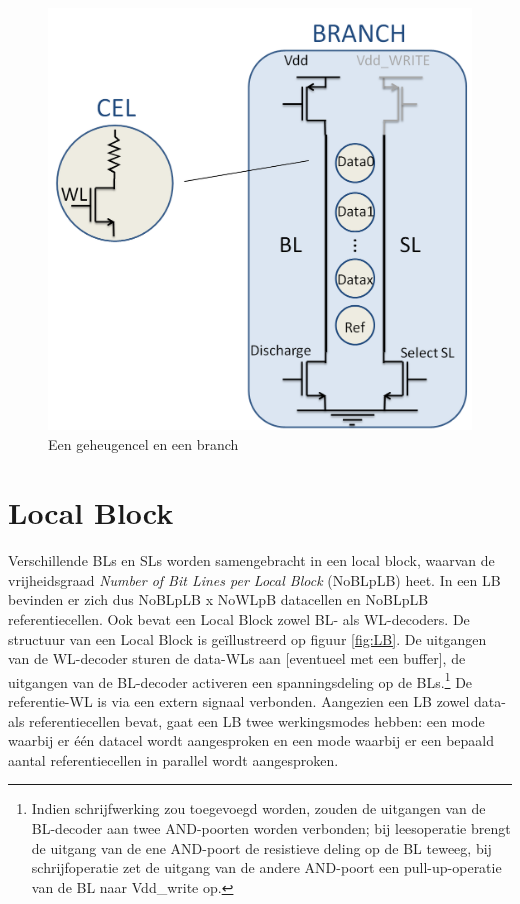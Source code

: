 \begin{figure}
  \centering
  \includegraphics[scale=0.3]{../fig/hfdstk-architecture-cell-branch.png}
  \caption{Een geheugencel en een branch}
  \label{fig:cellbranch}
\end{figure}

\section{Local Block}
Verschillende BLs en SLs worden samengebracht in een local block, waarvan de vrijheidsgraad \emph{Number of Bit Lines per Local Block} (NoBLpLB) heet. In een LB bevinden er zich dus NoBLpLB x NoWLpB datacellen en NoBLpLB referentiecellen. Ook bevat een Local Block zowel BL- als WL-decoders.
De structuur van een Local Block is geïllustreerd op figuur \ref{fig:LB}.
De uitgangen van de WL-decoder sturen de data-WLs aan [eventueel met een buffer], de uitgangen van de BL-decoder activeren een spanningsdeling op de BLs.\footnote{Indien schrijfwerking zou toegevoegd worden, zouden de uitgangen van de BL-decoder aan twee AND-poorten worden verbonden; bij leesoperatie brengt de uitgang van de ene AND-poort de resistieve deling op de BL teweeg, bij schrijfoperatie zet de uitgang van de andere AND-poort een pull-up-operatie van de BL naar Vdd\_write op.} De referentie-WL is via een extern signaal verbonden.
Aangezien een LB zowel data- als referentiecellen bevat, gaat een LB twee werkingsmodes hebben: een mode waarbij er één datacel wordt aangesproken en een mode waarbij er een bepaald aantal referentiecellen in parallel wordt aangesproken.

